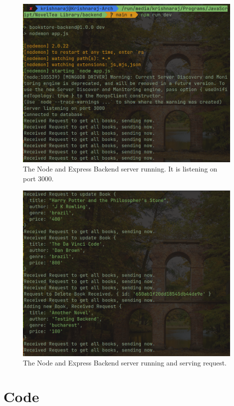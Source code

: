 \documentclass[11pt]{article}
\begin{document}
\begin{figure}[H]
    \centering
    \includegraphics[width=.95\textwidth]{Screenshots/backend 1.png}
    \caption{The Node and Express Backend server running. It is listening on port 3000.}
\end{figure}
\begin{figure}[H]
    \centering
    \includegraphics[width=.95\textwidth]{Screenshots/backend 2.png}
    \caption{The Node and Express Backend server running and serving request. }
\end{figure}

\section{Code}





\end{document}
